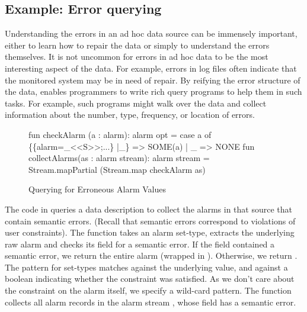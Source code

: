 \subsection{Example: Error querying}
Understanding the errors in an ad hoc data source can be immensely important, 
either to learn how to repair the data or simply to understand the errors themselves.  It is not uncommon for errors in ad hoc data to be the most interesting aspect of the data.  For example, errors in log files often indicate that the monitored system may be in need of repair.
By reifying the error structure of the data, \datatype{} enables programmers to write rich query programs to help them in such tasks.
For example, such programs might walk over the data and collect
information about the number, type, frequency, or location of errors.


\begin{figure}
  \centering
\begin{code}
fun checkAlarm (a : alarm): alarm opt =
    case a of 
	\{\{alarm=_<<S>>;...\} |_\} => SOME(a)
      | _ => NONE
\mbox{}
fun collectAlarms(as : alarm stream): alarm stream =
    Stream.mapPartial (Stream.map checkAlarm as)  
\end{code}
  \caption{Querying for Erroneous Alarm Values}
  \label{fig:ex-error-query}
\end{figure}

The code in  queries a \darkstar{} data
description to collect the alarms in that source that contain semantic errors. 
(Recall that semantic errors correspond to violations of user constraints). The function  takes an alarm set-type,
extracts the underlying raw alarm and checks its  field for
a semantic error.  If the  field contained a semantic error,
we return the entire alarm (wrapped in ). Otherwise, we
return . The pattern  for set-types
matches  against the underlying value, and  against
a boolean indicating whether the constraint was satisfied. As we don't
care about the constraint on the alarm itself, we specify a wild-card
pattern.   The function 
collects all alarm records in the alarm stream , whose
 field has a semantic error.


